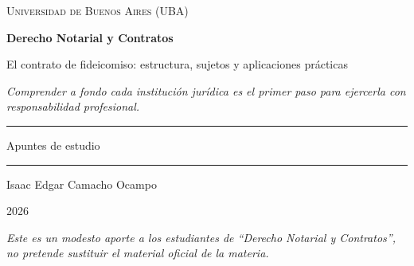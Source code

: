 \documentclass[12pt,oneside]{book}
\newcommand{\universidad}{Universidad de Buenos Aires (UBA)}
\newcommand{\materia}{Derecho Notarial y Contratos}
\newcommand{\titulo}{El contrato de fideicomiso: estructura, sujetos y aplicaciones prácticas}
\newcommand{\autor}{Isaac Edgar Camacho Ocampo}
\newcommand{\anio}{2026}
\begin{document}
\begin{titlepage}
\thispagestyle{empty}

\begin{center}

\vspace*{1cm}

{\large \textsc{\universidad}}

\vspace{3cm}

{\Huge \textbf{\materia}}

\vspace{1cm}

{\LARGE \titulo}

\vspace{0.8cm}

\textit{Comprender a fondo cada institución jurídica es el primer paso para ejercerla con responsabilidad profesional.}

\vspace{1.2cm}

\rule{0.70\textwidth}{0.5pt}

\vspace{0.5cm}

{\large Apuntes de estudio}

\vspace{0.5cm}

\rule{0.70\textwidth}{0.5pt}

\vfill

{\large \autor}

\vspace{0.3cm}

{\large \anio}

\end{center}

\vfill

\begin{flushleft}
\textit{Este es un modesto aporte a los estudiantes de ``Derecho Notarial y Contratos'', no pretende sustituir el material oficial de la materia.}
\end{flushleft}

\end{titlepage}

\tableofcontents

\end{document}
